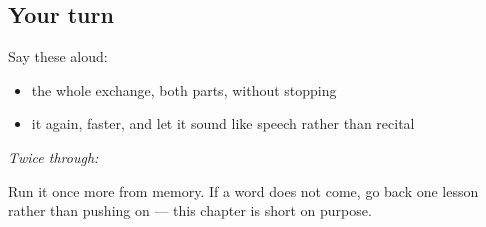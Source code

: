 \subsection*{Your turn}
Say these aloud:

\begin{itemize}
\raggedright
  \item the whole exchange, both parts, without stopping
  \item it again, faster, and let it sound like speech rather than recital
\end{itemize}

\emph{Twice through:}

\begin{tcolorbox}[breakable,colback=teal!4,colframe=teal!35!black,title={Before you move on}]
Run it once more from memory. If a word does not come, go back one lesson rather than pushing on — this chapter is short on purpose.
\end{tcolorbox}
